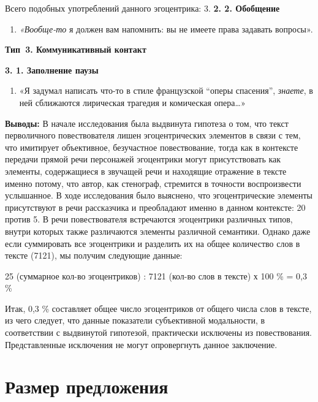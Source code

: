\documentclass{kursa4}
\begin{document}
      Всего подобных употреблений данного эгоцентрика: 3. \textbf{2. 2. Обобщение}
      \setcounter{saveenum}{\value{enumi}}
        \begin{enumerate}
        \setcounter{enumi}{\value{saveenum}}
        \item \textit{«Вообще-то} я должен вам напомнить: вы не имеете права задавать вопросы». \end{enumerate}
      {\centering
      \textbf{Тип~3. Коммуникативный контакт }
      \par}

      \textbf{3. 1. Заполнение паузы}

      \setcounter{saveenum}{\value{enumi}}
        \begin{enumerate}
        \setcounter{enumi}{\value{saveenum}}
        \item «Я задумал написать что-то в стиле французской “оперы спасения”, \textit{знаете}, в ней сближаются лирическая трагедия и комическая опера…» \end{enumerate}

      \textbf{Выводы:}{
      В начале исследования была выдвинута гипотеза о том, что текст перволичного повествователя лишен эгоцентрических элементов в связи с тем, что имитирует объективное, безучастное повествование, тогда как в контексте передачи прямой речи персонажей эгоцентрики могут присутствовать как элементы, содержащиеся в звучащей речи и находящие отражение в тексте именно потому, что автор, как стенограф, стремится в точности воспроизвести услышанное. В ходе исследования было выяснено, что эгоцентрические элементы присутствуют в речи рассказчика и преобладают именно в данном контексте: 20 против 5. В речи повествователя встречаются эгоцентрики различных типов, внутри которых также различаются элементы различной семантики. Однако даже если суммировать все эгоцентрики и разделить их на общее количество слов в тексте (7121), мы получим следующие данные:}

      {25 (суммарное кол-во эгоцентриков) : 7121 (кол-во слов в тексте) х 100 \% = 0,3 \%}

      Итак, 0,3 \% составляет общее число эгоцентриков от общего числа слов в тексте, из чего следует, что данные показатели субъективной модальности, в соответствии с выдвинутой гипотезой, практически исключены из повествования. Представленные исключения не могут опровергнуть данное заключение. \section{Размер предложения}
\end{document}
